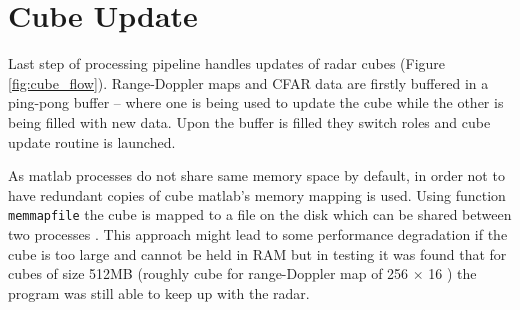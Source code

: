 \section{Cube Update}

Last step of processing pipeline handles updates of radar cubes (Figure \ref{fig:cube_flow}).
Range-Doppler maps and CFAR data are firstly buffered in a ping-pong buffer -- where one is being used to update the cube while the other is being filled with new data.
Upon the buffer is filled they switch roles and cube update routine is launched.

As matlab processes do not share same memory space by default, in order not to have redundant copies of cube matlab's memory mapping is used.
Using function \texttt{memmapfile} the cube is mapped to a file on the disk which can be shared between two processes \cite{matlab_memory}.
This approach might lead to some performance degradation if the cube is too large and cannot be held in RAM but in testing it was found that for cubes of size 512MB (roughly cube for range-Doppler map of 256 $\times$ 16 ) the program was still able to keep up with the radar.


